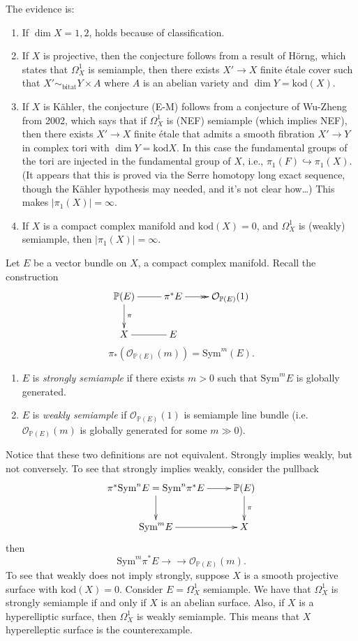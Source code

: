 The evidence is:
\begin{enumerate}
\item If $\dim X=1,2$, holds because of
classification.
\item If $X$ is projective, then the
conjecture follows from
a result of Hörng, which states that
$\Omega_X^1$ is semiample,
then there exists $X'\to X$ finite étale
cover
such that $X'\sim_{\text{bitat}}Y\times A$
where $A$
is an abelian variety and  $\dim
Y=\text{kod}(X)$.
\item If $X$ is Kähler, the conjecture (E-M)
follows
from a conjecture of Wu-Zheng from 2002,
which says that
if  $\Omega^1_X$ is (NEF) semiample (which
implies NEF), then
there exists $X' \to X$ finite étale that
admits a smooth fibration
$X' \to Y$ in complex tori with $\dim
Y=\text{kod}X$.
In this case the fundamental groups of the
tori are injected
in the fundamental group of $X$, i.e.,
$\pi_1(F) \hookrightarrow \pi_1(X)$.
(It appears that this is proved via the Serre
homotopy
long exact sequence, though the Kähler
hypothesis may needed, and
it's not clear how…)
This makes $|\pi_1(X)|=\infty$.

\item If $X$ is a compact complex manifold
and $\text{kod}(X)=0$,
and $\Omega_X^1$ is (weakly) semiample, then
$|\pi_1(X)|=\infty$.
\end{enumerate}

\noindent

\begin{definition}
\label{definition-duplicate-3}
Let $E$ be a vector bundle on $X$, a compact
complex manifold.
Recall the construction
$$
\xymatrix{
\mathbb{P}(E)\ar[d]^{\pi}\ar@{-}[r]&\pi^*
E\ar@{->>}[r]
&\mathcal{O}_{\mathbb{P}(E)}(1)\\
X\ar@{-}[r]&E
}
$$
$$
\pi_*(\mathcal{O}_{\mathbb{P}(E)}(m))=
\text{Sym}^m(E).
$$
\begin{enumerate}
\item $E$ is {\it strongly semiample} if
there exists $m>0$
such that $\text{Sym}^mE$ is globally
generated.
\item $E$ is {\it weakly semiample} if
$\mathcal{O}_{\mathbb{P}(E)}(1)$ is semiample
line bundle
(i.e. $\mathcal{O}_{\mathbb{P}(E)}(m)$ is
globally generated
for some $m\gg 0$).
\end{enumerate}
\end{definition}

\noindent
Notice that these two definitions are not
equivalent.
Strongly implies weakly, but not conversely.
To see that strongly implies weakly, consider
the pullback
$$
\xymatrix{
\pi^*\text{Sym}^nE=\text{Sym}^n\pi^*E\ar[r]
\ar[d]&\mathbb{P}(E)\ar[d]^{\pi}\\
\text{Sym}^mE\ar[r]&X
}
$$
then
 $$
\text{Sym}^m\pi^* E
\to\!\!\!\!\!\to\mathcal{O}
_{\mathbb{P}(E)}(m).
$$
To see that weakly does not imply strongly,
suppose $X$ is a smooth projective
surface with $\text{kod}(X)=0$.
Consider $E=\Omega_X^1$ semiample. We have
that $\Omega_X^1$
is strongly semiample if and only if $X$ is
an abelian surface.
Also, if $X$ is a hyperelliptic surface, then
$\Omega_X^1$
is weakly semiample.
This means that $X$ hyperelleptic surface is
the counterexample.

